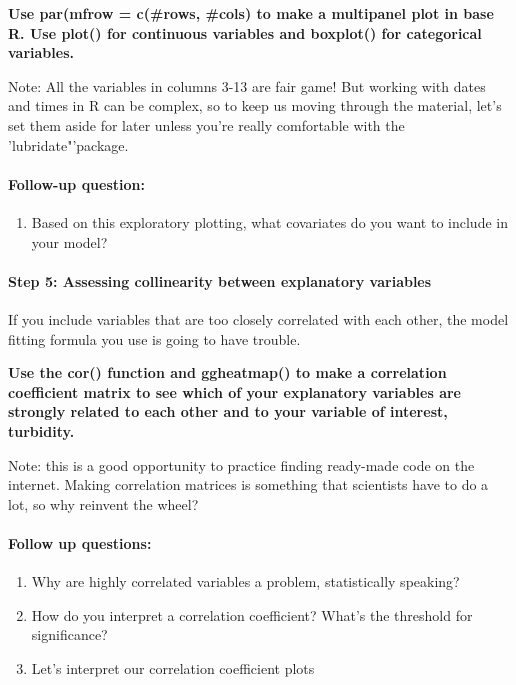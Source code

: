\documentclass[]{article}
\providecommand{\tightlist}{%
  \setlength{\itemsep}{0pt}\setlength{\parskip}{0pt}}
\let\oldparagraph\paragraph
\renewcommand{\paragraph}[1]{\oldparagraph{#1}\mbox{}}
\begin{document}
\textbf{Use par(mfrow = c(\#rows, \#cols) to make a multipanel plot in
base R. Use plot() for continuous variables and boxplot() for
categorical variables.}

Note: All the variables in columns 3-13 are fair game! But working with
dates and times in R can be complex, so to keep us moving through the
material, let's set them aside for later unless you're really
comfortable with the 'lubridate"'package.

\hypertarget{follow-up-question}{%
\paragraph{Follow-up question:}\label{follow-up-question}}

\begin{enumerate}
\def\labelenumi{\arabic{enumi}.}
\tightlist
\item
  Based on this exploratory plotting, what covariates do you want to
  include in your model?
\end{enumerate}

\hypertarget{step-5-assessing-collinearity-between-explanatory-variables}{%
\paragraph{Step 5: Assessing collinearity between explanatory
variables}\label{step-5-assessing-collinearity-between-explanatory-variables}}

If you include variables that are too closely correlated with each
other, the model fitting formula you use is going to have trouble.

\textbf{Use the cor() function and ggheatmap() to make a correlation
coefficient matrix to see which of your explanatory variables are
strongly related to each other and to your variable of interest,
turbidity.}

Note: this is a good opportunity to practice finding ready-made code on
the internet. Making correlation matrices is something that scientists
have to do a lot, so why reinvent the wheel?

\hypertarget{follow-up-questions-1}{%
\paragraph{Follow up questions:}\label{follow-up-questions-1}}

\begin{enumerate}
\def\labelenumi{\arabic{enumi}.}
\tightlist
\item
  Why are highly correlated variables a problem, statistically speaking?
\item
  How do you interpret a correlation coefficient? What's the threshold
  for significance?
\item
  Let's interpret our correlation coefficient plots
\end{enumerate}
\end{document}
